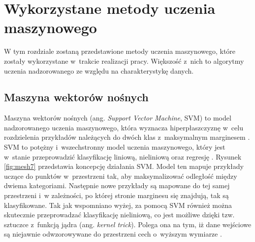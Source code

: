 \section{Wykorzystane metody uczenia maszynowego}
\label{cha:Wykorzystane metody uczenia maszynowego}

W tym rozdziale zostaną przedstawione metody uczenia maszynowego, które zostały wykorzystane w~trakcie realizacji pracy. Większość z~nich to algorytmy uczenia nadzorowanego ze względu na charakterystykę danych.

\subsection{Maszyna wektorów nośnych}
\label{cha:Maszyna wektorów nośnych}

Maszyna wektorów nośnych (ang. \textit{Support Vector Machine}, SVM) to model nadzorowanego uczenia maszynowego, która wyznacza hiperpłaszczyznę w~celu rozdzielenia przykładów należących do dwóch klas z~maksymalnym marginesem \cite{Sawka20}. SVM to potężny i~wszechstronny model uczenia maszynowego, który jest w~stanie przeprowadzić klasyfikację liniową, nieliniową oraz regresję \cite{Sawka18}. Rysunek \ref{fig:mesh7} przedstawia koncepcję działania SVM. Model ten mapuje przykłady uczące do punktów w~przestrzeni tak, aby maksymalizować odległość między dwiema kategoriami. Następnie nowe przykłady są mapowane do tej samej przestrzeni i~w zależności, po której stronie marginesu się znajdują, tak są klasyfikowane. Tak jak wspomniano wyżej, za pomocą SVM również można skutecznie przeprowadzać klasyfikację nieliniową, co jest możliwe dzięki tzw. sztuczce z~funkcją jądra (ang. \textit{kernel trick}). Polega ona na tym, iż dane wejściowe są niejawnie odwzorowywane do przestrzeni cech o~wyższym wymiarze \cite{Boser92}. 

